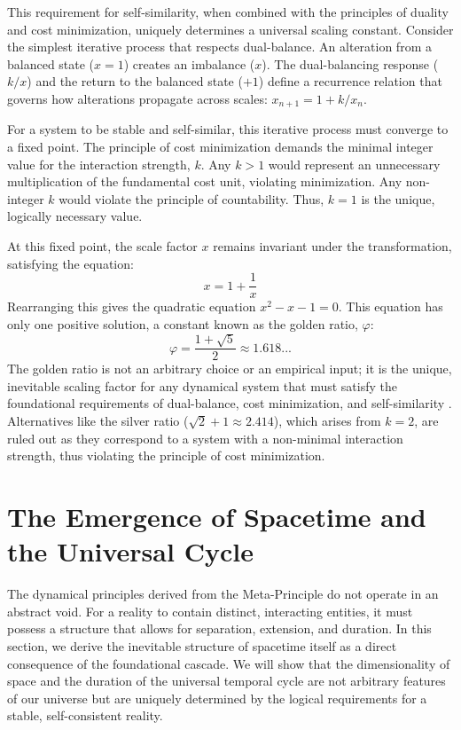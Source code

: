 This requirement for self-similarity, when combined with the principles of duality and cost minimization, uniquely determines a universal scaling constant. Consider the simplest iterative process that respects dual-balance. An alteration from a balanced state (\(x=1\)) creates an imbalance (\(x\)). The dual-balancing response (\(k/x\)) and the return to the balanced state (\(+1\)) define a recurrence relation that governs how alterations propagate across scales: \(x_{n+1} = 1 + k/x_n\).

For a system to be stable and self-similar, this iterative process must converge to a fixed point. The principle of cost minimization demands the minimal integer value for the interaction strength, \(k\). Any \(k>1\) would represent an unnecessary multiplication of the fundamental cost unit, violating minimization. Any non-integer \(k\) would violate the principle of countability. Thus, \(k=1\) is the unique, logically necessary value.

At this fixed point, the scale factor \(x\) remains invariant under the transformation, satisfying the equation:
\begin{equation}
x = 1 + \frac{1}{x}
\end{equation}
Rearranging this gives the quadratic equation \(x^2 - x - 1 = 0\). This equation has only one positive solution, a constant known as the golden ratio, \(\varphi\):
\begin{equation}
\varphi = \frac{1 + \sqrt{5}}{2} \approx 1.618...
\end{equation}
The golden ratio is not an arbitrary choice or an empirical input; it is the unique, inevitable scaling factor for any dynamical system that must satisfy the foundational requirements of dual-balance, cost minimization, and self-similarity \cite{Livio2002}. Alternatives like the silver ratio (\(\sqrt{2}+1 \approx 2.414\)), which arises from \(k=2\), are ruled out as they correspond to a system with a non-minimal interaction strength, thus violating the principle of cost minimization.

\section{The Emergence of Spacetime and the Universal Cycle}

The dynamical principles derived from the Meta-Principle do not operate in an abstract void. For a reality to contain distinct, interacting entities, it must possess a structure that allows for separation, extension, and duration. In this section, we derive the inevitable structure of spacetime itself as a direct consequence of the foundational cascade. We will show that the dimensionality of space and the duration of the universal temporal cycle are not arbitrary features of our universe but are uniquely determined by the logical requirements for a stable, self-consistent reality.

